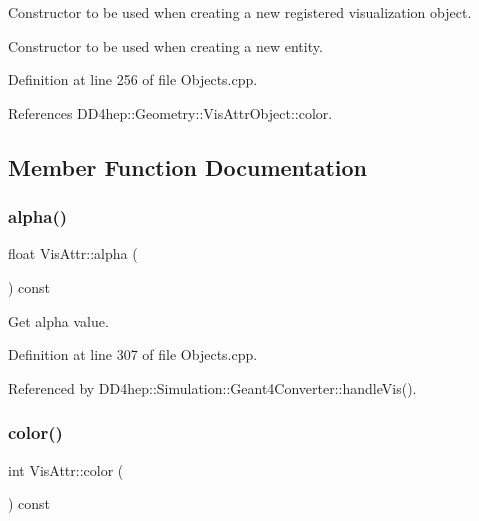 Constructor to be used when creating a new registered visualization object. 

Constructor to be used when creating a new entity. 

Definition at line 256 of file Objects.\+cpp.



References D\+D4hep\+::\+Geometry\+::\+Vis\+Attr\+Object\+::color.



\subsection{Member Function Documentation}
\hypertarget{class_d_d4hep_1_1_geometry_1_1_vis_attr_aa03d4b09f7e77bfa226e6e2f4c53c17e}{}\label{class_d_d4hep_1_1_geometry_1_1_vis_attr_aa03d4b09f7e77bfa226e6e2f4c53c17e} 
\subsubsection{\texorpdfstring{alpha()}{alpha()}}
{\footnotesize\ttfamily float Vis\+Attr\+::alpha (\begin{DoxyParamCaption}{ }\end{DoxyParamCaption}) const}



Get alpha value. 



Definition at line 307 of file Objects.\+cpp.



Referenced by D\+D4hep\+::\+Simulation\+::\+Geant4\+Converter\+::handle\+Vis().

\hypertarget{class_d_d4hep_1_1_geometry_1_1_vis_attr_a31539af01a3377eae58fb6b1286b8eee}{}\label{class_d_d4hep_1_1_geometry_1_1_vis_attr_a31539af01a3377eae58fb6b1286b8eee} 
\subsubsection{\texorpdfstring{color()}{color()}}
{\footnotesize\ttfamily int Vis\+Attr\+::color (\begin{DoxyParamCaption}{ }\end{DoxyParamCaption}) const}



